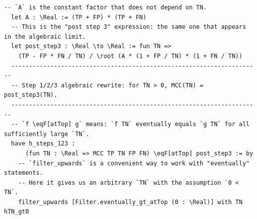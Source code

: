 \documentclass{article}
\begin{document}
\begin{lstlisting}[language=lean, firstnumber=last]
  -- `A` is the constant factor that does not depend on TN.
  let A : \Real := (TP + FP) * (TP + FN)
  -- This is the "post step 3" expression: the same one that appears in the algebraic limit.
  let post_step3 : \Real \to \Real := fun TN =>
    (TP - FP * FN / TN) / \root (A * (1 + FP / TN) * (1 + FN / TN))
  ----------------------------------------------------------------------
  -- Step 1/2/3 algebraic rewrite: for TN > 0, MCC(TN) = post_step3(TN).
  ----------------------------------------------------------------------
  -- `f \eqF[atTop] g` means: `f TN` eventually equals `g TN` for all sufficiently large `TN`.
  have h_steps_123 :
      (fun TN : \Real => MCC TP TN FP FN) \eqF[atTop] post_step3 := by
    -- `filter_upwards` is a convenient way to work with "eventually" statements.
    -- Here it gives us an arbitrary `TN` with the assumption `0 < TN`.
    filter_upwards [Filter.eventually_gt_atTop (0 : \Real)] with TN hTN_gt0


\end{lstlisting}
\end{document}
